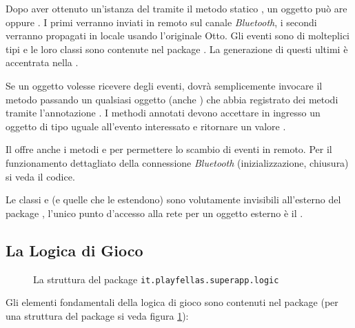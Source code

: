 Dopo aver ottenuto un'istanza del  tramite il metodo statico , un oggetto può are  oppure . I primi verranno inviati in remoto sul canale \textit{Bluetooth}, i secondi verranno propagati in locale usando l'originale Otto. Gli eventi sono di molteplici tipi e le loro classi sono contenute nel package . La generazione di questi ultimi è accentrata nella .

Se un oggetto volesse ricevere degli eventi, dovrà semplicemente invocare il metodo  passando un qualsiasi oggetto (anche ) che abbia registrato dei metodi tramite l'annotazione . I methodi annotati devono accettare in ingresso un oggetto di tipo uguale all'evento interessato e ritornare un valore .

Il  offre anche i metodi  e  per permettere lo scambio di eventi in remoto. Per il funzionamento dettagliato della connessione \textit{Bluetooth} (inizializzazione, chiusura) si veda il codice.

Le classi  e  (e quelle che le estendono) sono volutamente invisibili all'esterno del package , l'unico punto d'accesso alla rete per un oggetto esterno è il .

\subsection{La Logica di Gioco}
\label{subsec:logic}

\begin{figure}[h!]
\caption{La struttura del package \texttt{it.playfellas.superapp.logic}}
\label{fig:tree_logic}
\end{figure}

Gli elementi fondamentali della logica di gioco sono contenuti nel package  (per una struttura del package si veda figura \ref{fig:tree_logic}):

